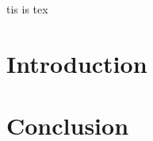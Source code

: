 \documentclass{article}
\begin{document}
tis is tex
\section{Introduction} 

\section{Conclusion} 
\end{document}
